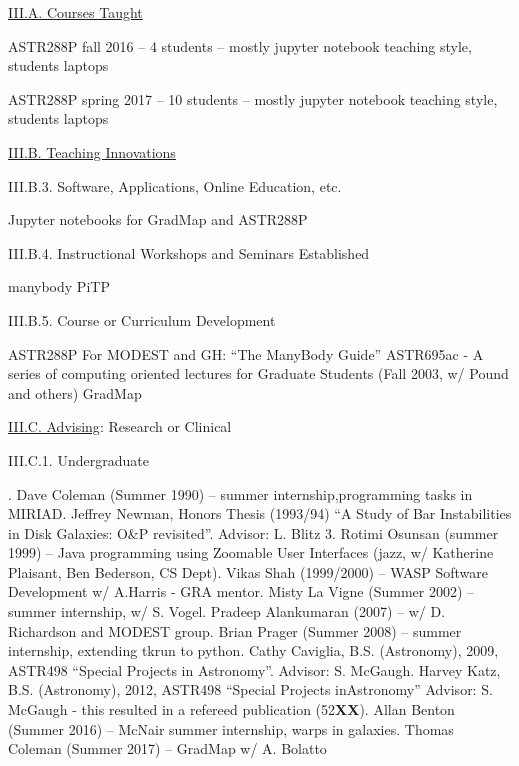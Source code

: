 \documentclass[11pt,letterpaper]{article}
\newcommand{\newi}{\newline\indent}
\begin{document}
\underline{III.A. Courses Taught}


ASTR288P fall 2016 --  4 students -- mostly jupyter notebook teaching style, students laptops

ASTR288P spring 2017 -- 10 students -- mostly jupyter notebook teaching style, students laptops


\underline{III.B. Teaching Innovations}


 
III.B.3. Software, Applications, Online Education, etc.

Jupyter notebooks for GradMap and ASTR288P

III.B.4. Instructional Workshops and Seminars Established

manybody\newi
PiTP\newi

III.B.5. Course or Curriculum Development

ASTR288P\newi
For MODEST and GH: ``The ManyBody Guide''\newi
ASTR695ac - A series of computing oriented lectures for Graduate Students (Fall 2003, w/ Pound and others)\newi
GradMap \newi





\underline{III.C. Advising}: Research or Clinical


III.C.1. Undergraduate

. Dave Coleman (Summer 1990) -- summer internship,programming tasks in MIRIAD\newi
2. Jeffrey Newman, Honors Thesis (1993/94) ``A Study of Bar Instabilities in Disk Galaxies: O\&P revisited''. Advisor: L. Blitz
3. Rotimi Osunsan (summer 1999) -- Java programming using Zoomable User Interfaces (jazz, w/ Katherine Plaisant, Ben Bederson, CS Dept)\newi
4. Vikas Shah (1999/2000) -- WASP Software Development w/ A.Harris - GRA mentor\newi
5. Misty La Vigne (Summer 2002) -- summer internship, w/ S. Vogel\newi
6. Pradeep Alankumaran (2007) -- w/ D. Richardson and MODEST group\newi
7. Brian Prager (Summer 2008) -- summer internship, extending tkrun to python\newi
8. Cathy Caviglia, B.S. (Astronomy), 2009,  ASTR498 ``Special Projects in Astronomy''.  Advisor:  S. McGaugh\newi
9. Harvey Katz, B.S. (Astronomy), 2012,  ASTR498  ``Special Projects inAstronomy''
 Advisor:  S. McGaugh -  this resulted in a refereed publication (52{\bf XX})\newi
10. Allan Benton (Summer 2016) -- McNair summer internship, warps in galaxies\newi
11. Thomas Coleman (Summer 2017) -- GradMap w/ A. Bolatto\newi
\end{document}
